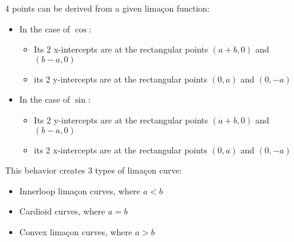 \documentclass{report}
\begin{document}
    4 points can be derived from a given limaçon function:
    \begin{itemize}
        \item In the case of $\cos$:
        \begin{itemize}
            \item Its 2 x-intercepts are at the rectangular points $(a+b,0)$ and $(b-a,0)$
            \item its 2 y-intercepts are at the rectangular points $(0,a)$ and $(0,-a)$
        \end{itemize}
        \item In the case of $\sin$:
        \begin{itemize}
            \item Its 2 y-intercepts are at the rectangular points $(a+b,0)$ and $(b-a,0)$
            \item its 2 x-intercepts are at the rectangular points $(0,a)$ and $(0,-a)$
        \end{itemize}
    \end{itemize}

    This behavior creates 3 types of limaçon curve:
    \begin{itemize}
        \item Innerloop limaçon curves, where $a<b$
        \item Cardioid curves, where $a=b$
        \item Convex limaçon curves, where $a>b$
    \end{itemize}

\end{document}
